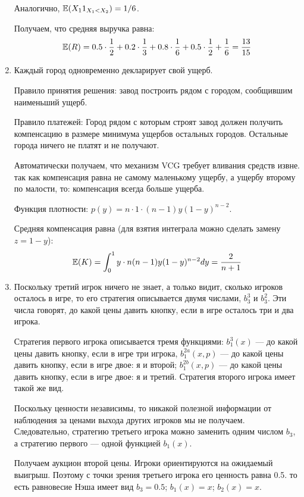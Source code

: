 \begin{enumerate}
Аналогично, $ \operatorname{\mathbb{E}}(X_{1}1_{X_{1}<X_{2}})=1/6 $.

Получаем, что средняя выручка равна:
\begin{equation}
\operatorname{\mathbb{E}}(R)=0.5\cdot \frac{1}{2}+0.2\cdot \frac{1}{3}+0.8\cdot \frac{1}{6}+0.5\cdot \frac{1}{2}+\frac{1}{6}=\frac{13}{15}
\end{equation}

\item  Каждый город одновременно декларирует свой ущерб.

Правило принятия решения: завод построить рядом с городом, сообщившим наименьший ущерб.

Правило платежей: Город рядом с которым строят завод должен получить компенсацию в размере минимума ущербов остальных городов. Остальные города ничего не платят и не получают.

Автоматически получаем, что механизм VCG требует вливания средств извне. так как компенсация равна не самому маленькому ущербу, а ущербу второму по малости, то: компенсация всегда больше ущерба.

Функция плотности: $ p(y)=n\cdot 1\cdot (n-1)y(1-y)^{n-2} $.

Средняя компенсация равна (для взятия интеграла можно сделать замену $ z=1-y $):
\begin{equation}
\operatorname{\mathbb{E}}(K)=\int_{0}^{1}y\cdot n(n-1)y(1-y)^{n-2}dy=\frac{2}{n+1}
\end{equation}




\item  Поскольку третий игрок ничего не знает, а только видит, сколько игроков осталось в игре, то его стратегия описывается двумя числами, $ b_{3}^{3} $ и $ b_{3}^{2} $. Эти числа говорят, до какой цены давить кнопку, если в игре осталось три и два игрока.

Стратегия первого игрока описывается тремя функциями: $ b_{1}^{3}(x) $ — до какой цены давить кнопку, если в игре три игрока, $b_{1}^{2a}(x,p)$ — до какой цены давить кнопку, если в игре двое: я и второй; $b_{1}^{2b}(x,p)$ — до какой цены давить кнопку, если в игре двое: я и третий. Стратегия второго игрока имеет такой же вид.

Поскольку ценности независимы, то никакой полезной информации от наблюдения за ценами выхода других игроков мы не получаем. Следовательно, стратегию третьего игрока можно заменить одним числом $ b_{3} $, а стратегию первого — одной функцией $b_{1}(x)$.

Получаем аукцион второй цены. Игроки ориентируются на ожидаемый выигрыш. Поэтому с точки зрения третьего игрока его ценность равна 0.5. то есть равновесие Нэша имеет вид $ b_{3}=0.5 $; $ b_{1}(x)=x $; $ b_{2}(x)=x $.


\end{enumerate}
